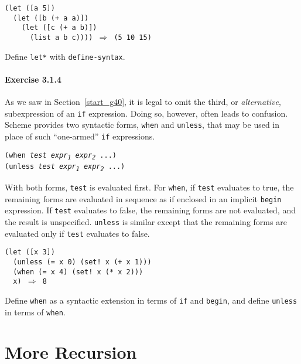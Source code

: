 \begin{alltt}
(let ([a 5])
  (let ([b (+ a a)])
    (let ([c (+ a b)])
      (list a b c)))) \(\Rightarrow\) (5 10 15)
\end{alltt}


Define \texttt{let*} with \texttt{define-syntax}.




\paragraph{Exercise \label{further_g54}3.1.4}


\label{further_s29}As we saw in Section \ref{start_g40},
it is legal to omit the third, or \textit{alternative}, subexpression
of an \texttt{if} expression.
Doing so, however, often leads to confusion.
Scheme provides two syntactic forms,
\label{further_s30}\texttt{when} and \label{further_s31}\texttt{unless},
that may be used in place of
such ``one-armed'' \texttt{if} expressions.


\begin{alltt}
(when \textit{test} \textit{expr\textsubscript{1}} \textit{expr\textsubscript{2}} ...)
(unless \textit{test} \textit{expr\textsubscript{1}} \textit{expr\textsubscript{2}} ...)
\end{alltt}


With both forms, \texttt{test} is evaluated first.
For \texttt{when}, if \texttt{test} evaluates to true, the remaining
forms are evaluated in sequence as if enclosed in an implicit
\texttt{begin} expression.
If \texttt{test} evaluates to false, the remaining forms are not
evaluated, and the result is unspecified.
\texttt{unless} is similar except that
the remaining forms are evaluated only if \texttt{test}
evaluates to false.


\begin{alltt}
(let ([x 3])
  (unless (= x 0) (set! x (+ x 1)))
  (when (= x 4) (set! x (* x 2)))
  x) \(\Rightarrow\) 8
\end{alltt}


Define \texttt{when} as a syntactic extension in terms of \texttt{if}
and \texttt{begin}, and define \texttt{unless}
in terms of \texttt{when}.




\section{\label{further_g55}\label{further_h2}More Recursion\label{further_SECTGFMORERECURSION}}



